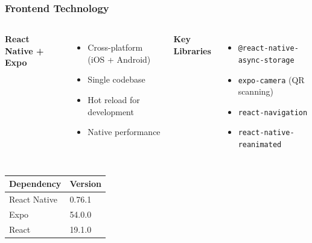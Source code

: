 \documentclass[11pt]{beamer}
\begin{document}
\begin{frame}
\frametitle{Frontend Technology}
\begin{columns}[T]
\textbf{React Native + Expo}
\begin{itemize}
    \item Cross-platform (iOS + Android)
    \item Single codebase
    \item Hot reload for development
    \item Native performance
\end{itemize}

\textbf{Key Libraries}
\begin{itemize}
    \item \texttt{@react-native-async-storage}
    \item \texttt{expo-camera} (QR scanning)
    \item \texttt{react-navigation}
    \item \texttt{react-native-reanimated}
\end{itemize}
\end{columns}

\vspace{1cm}
\begin{center}
\begin{tabularx}{0.8\textwidth}{|X|X|}
\hline
\textbf{Dependency} & \textbf{Version} \\
\hline
React Native & 0.76.1 \\
Expo & 54.0.0 \\
React & 19.1.0 \\
\hline
\end{tabularx}
\end{center}
\end{frame}
\end{document}
